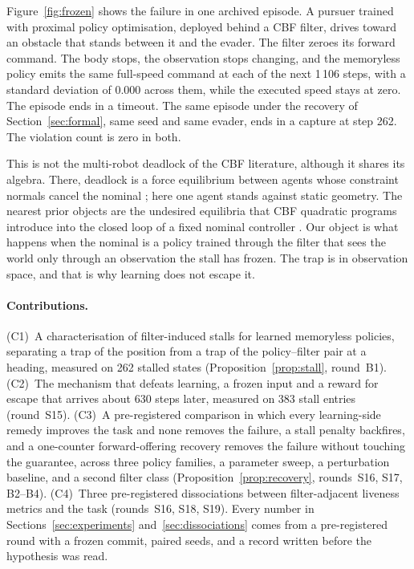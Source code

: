 \documentclass{l4dc2027}
\begin{document}
Figure~\ref{fig:frozen} shows the failure in one archived episode. A pursuer trained with proximal policy optimisation, deployed behind a CBF filter, drives toward an obstacle that stands between it and the evader. The filter zeroes its forward command. The body stops, the observation stops changing, and the memoryless policy emits the same full-speed command at each of the next 1\,106 steps, with a standard deviation of 0.000 across them, while the executed speed stays at zero. The episode ends in a timeout. The same episode under the recovery of Section~\ref{sec:formal}, same seed and same evader, ends in a capture at step 262. The violation count is zero in both.

This is not the multi-robot deadlock of the CBF literature, although it shares its algebra. There, deadlock is a force equilibrium between agents whose constraint normals cancel the nominal \citep{grover2020symmetry,grover2021deadlock,grover2023before}; here one agent stands against static geometry. The nearest prior objects are the undesired equilibria that CBF quadratic programs introduce into the closed loop of a fixed nominal controller \citep{reis2021cbfqp,tan2024undesired}. Our object is what happens when the nominal is a policy trained through the filter that sees the world only through an observation the stall has frozen. The trap is in observation space, and that is why learning does not escape it.

\paragraph{Contributions.} (C1)~A characterisation of filter-induced stalls for learned memoryless policies, separating a trap of the position from a trap of the policy--filter pair at a heading, measured on 262 stalled states (Proposition~\ref{prop:stall}, round~B1). (C2)~The mechanism that defeats learning, a frozen input and a reward for escape that arrives about 630 steps later, measured on 383 stall entries (round~S15). (C3)~A pre-registered comparison in which every learning-side remedy improves the task and none removes the failure, a stall penalty backfires, and a one-counter forward-offering recovery removes the failure without touching the guarantee, across three policy families, a parameter sweep, a perturbation baseline, and a second filter class (Proposition~\ref{prop:recovery}, rounds~S16, S17, B2--B4). (C4)~Three pre-registered dissociations between filter-adjacent liveness metrics and the task (rounds~S16, S18, S19). Every number in Sections~\ref{sec:experiments} and~\ref{sec:dissociations} comes from a pre-registered round with a frozen commit, paired seeds, and a record written before the hypothesis was read.
\end{document}
